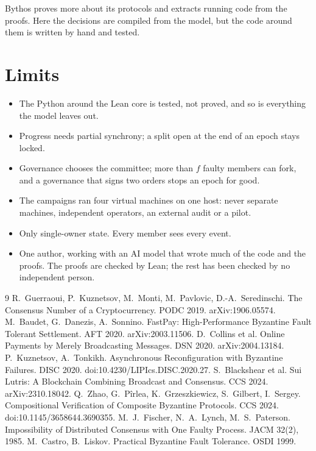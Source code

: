 \documentclass[10pt,a4paper]{article}
\begin{document}
Bythos proves more about its protocols and extracts running code from the proofs. Here the decisions are
compiled from the model, but the code around them is written by hand and tested.

\section{Limits}

\begin{itemize}
\item The Python around the Lean core is tested, not proved, and so is everything the model leaves out.
\item Progress needs partial synchrony; a split open at the end of an epoch stays locked.
\item Governance chooses the committee; more than $f$ faulty members can fork, and a governance that signs
two orders stops an epoch for good.
\item The campaigns ran four virtual machines on one host: never separate machines, independent operators,
an external audit or a pilot.
\item Only single-owner state. Every member sees every event.
\item One author, working with an AI model that wrote much of the code and the proofs. The proofs are
checked by Lean; the rest has been checked by no independent person.
\end{itemize}

\begin{thebibliography}{9}\small
{} R.~Guerraoui, P.~Kuznetsov, M.~Monti, M.~Pavlovic, D.-A.~Seredinschi. The Consensus Number of a Cryptocurrency. PODC 2019. arXiv:1906.05574.
 M.~Baudet, G.~Danezis, A.~Sonnino. FastPay: High-Performance Byzantine Fault Tolerant Settlement. AFT 2020. arXiv:2003.11506.
 D.~Collins et al. Online Payments by Merely Broadcasting Messages. DSN 2020. arXiv:2004.13184.
 P.~Kuznetsov, A.~Tonkikh. Asynchronous Reconfiguration with Byzantine Failures. DISC 2020. doi:10.4230/LIPIcs.DISC.2020.27.
 S.~Blackshear et al. Sui Lutris: A Blockchain Combining Broadcast and Consensus. CCS 2024. arXiv:2310.18042.
 Q.~Zhao, G.~P\^irlea, K.~Grzeszkiewicz, S.~Gilbert, I.~Sergey. Compositional Verification of Composite Byzantine Protocols. CCS 2024. doi:10.1145/3658644.3690355.
 M.~J.~Fischer, N.~A.~Lynch, M.~S.~Paterson. Impossibility of Distributed Consensus with One Faulty Process. JACM 32(2), 1985.
 M.~Castro, B.~Liskov. Practical Byzantine Fault Tolerance. OSDI 1999.
\end{thebibliography}
\end{document}
